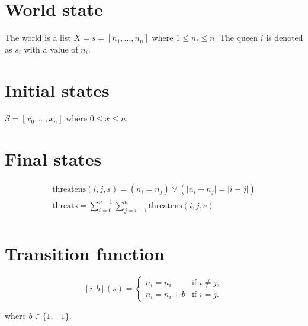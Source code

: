 \documentclass{article}
\begin{document}

\section{World state}\label{sec:world-state}

The world is a list \(X = s = [n_1, \ldots, n_n]\) where \(1 \leq n_i \leq n\). The queen \(i\) is denoted as \(s_i\) with a value of \(n_i\).

\section{Initial states}\label{sec:initial-states}

\(S = [x_0, \ldots, x_n]\) where \(0 \leq x \leq n\).

\section{Final states}\label{sec:final-states}

\begin{gather*}
    \text{{threatens}}(i, j, s) = (n_i = n_j) \lor (\lvert n_i - n_j \rvert = \lvert i - j \rvert)\\
    \text{{threats}} = \sum_{i=0}^{n-1} \sum_{j=i+1}^{n} \text{{threatens}}(i, j, s)\\
\end{gather*}

\section{Transition function}\label{sec:transition-function}

\[
[i, b](s) = \begin{cases}
    n_i = n_i & \text{{if }} i \neq j, \\
    n_i = n_i + b & \text{{if }} i = j.
\end{cases}
\]

where \(b \in \{1, -1\}\).
\end{document}
